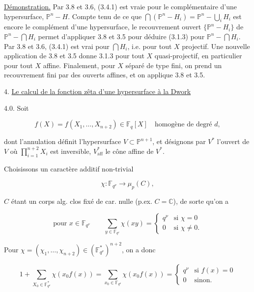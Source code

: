 
\underline{Démonstration.} Par 3.8 et 3.6, (3.4.1) est vraie pour le
complémentaire d'une hypersurface, $\mathbb P^n-H$. Compte tenu de ce que $\bigcap(\mathbb P^n-H_i)=\mathbb P^n-\bigcup_iH_i$ est encore le complément d'une hypersurface, le recouvrement ouvert
$\{\mathbb P^n-H_i\}$ de $\mathbb P^n-\bigcap H_i$ permet d'appliquer 3.8 et
3.5 pour déduire (3.1.3) pour $\mathbb P^n-\bigcap H_i$. Par 3.8 et 3.6,
(3.4.1) est vrai pour $\bigcap H_i$, i.e. pour tout $X$ projectif. Une
nouvelle application de 3.8 et 3.5 donne 3.1.3 pour tout $X$ quasi-projectif,
en particulier pour tout $X$ affine. Finalement, pour $X$ séparé de type
fini, on prend un recouvrement fini par des ouverts affines, et on applique
3.8 et 3.5.

4. \underline{Le calcul de la fonction zêta d'une hypersurface à la Dwork}

4.0. Soit

\begin{equation}\tag{4.0.1}
f(X)=f(X_1,\ldots,X_{n+2})\in\mathbb F_q[X]
\quad\text{homogène de degré }d,
\end{equation}

dont l'annulation définit l'hypersurface $V\subset\mathbb P^{n+1}$, et
désignons par $V^*$ l'ouvert de $V$ où
$\prod_{i=1}^{n+2}X_i$ est inversible, $V^*_{\mathrm{aff}}$ le cône affine
de $V^*$.

Choisissons un caractère additif non-trivial

\begin{equation}\tag{4.0.2}
\chi:\mathbb F_{q^\nu}\longrightarrow\mu_p(C),
\end{equation}

$C$ étant un corps alg. clos fixé de car. nulle
(p.ex. $C=\mathbb C$), de sorte qu'on a

\begin{equation}\tag{4.0.3}
\text{pour }x\in\mathbb F_{q^\nu}\qquad
\sum_{y\in\mathbb F_{q^\nu}}\chi(xy)=
\begin{cases}
q^\nu&\text{si }\chi=0\\
0&\text{si }\chi\ne0.
\end{cases}
\end{equation}

Pour $\chi=(\chi_1,\ldots,\chi_{n+2})\in(\mathbb F_{q^\nu}^*)^{n+2}$, on a donc


\begin{equation}\tag{4.0.4}
1+\sum_{X_0\in\mathbb F_{q^\nu}^*}\chi(x_0f(x))
=\sum_{x_0\in\mathbb F_{q^\nu}}\chi(x_0f(x))
=
\begin{cases}
q^\nu&\text{si }f(x)=0\\
0&\text{sinon}.
\end{cases}
\end{equation}

